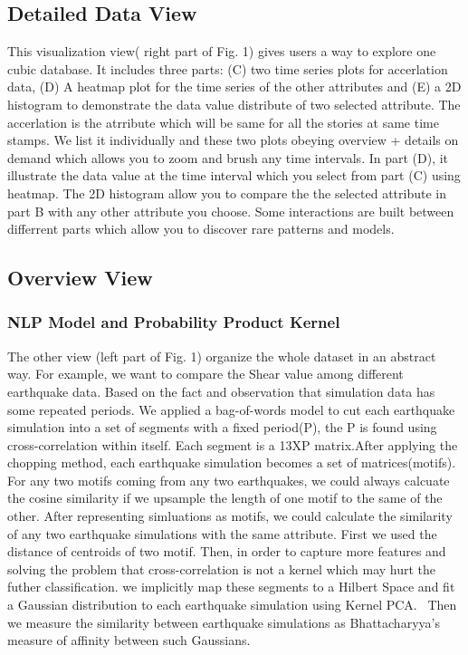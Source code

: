 \subsection{Detailed Data View}
\label{sec:context }
This visualization view( right part of Fig. 1) gives users a way to explore one cubic database. It includes three parts: (C) two time series plots for accerlation data, (D) A heatmap plot for the time series of the other attributes and (E) a 2D histogram to demonstrate the data value distribute of two selected attribute. The accerlation is the atrribute which will be same for all the stories at same time stamps. We list it individually and these two plots obeying overview + details on demand which allows you to zoom and brush any  time intervals. In part (D), it illustrate the data value at the time interval which you select from part (C) using heatmap. The 2D histogram allow you to compare the the selected attribute in part B with any other attribute you choose. Some interactions are built between differrent parts which allow you to discover rare patterns and models.

\subsection{Overview View}
\subsubsection{NLP Model and Probability Product Kernel}
\label{sec:method}
The other view (left part of Fig. 1) organize the whole dataset in an abstract way. For example, we want to compare the Shear value among different earthquake data. Based on the fact and observation that simulation data has some repeated periods. We applied a bag-of-words model to cut each earthquake simulation into a set of segments with a fixed period(P), the P is found using cross-correlation within itself. Each segment is a 13XP matrix.After applying the chopping method, each earthquake simulation becomes a set of matrices(motifs). For any two motifs coming from any two earthquakes, we could always calcuate the cosine similarity if we upsample the length of one motif to the same of the other. After representing simluations as motifs, we could calculate the similarity of any two earthquake simulations with the same attribute. First we used the distance of centroids of two motif. Then, in order to capture more features and solving the problem that cross-correlation is not a kernel which may hurt the futher classification. we implicitly map these segments to a Hilbert Space and fit a Gaussian distribution to each earthquake simulation using Kernel PCA.~\cite{conf/icml/KondorJ03} Then we measure the similarity between earthquake simulations as Bhattacharyya’s measure of affinity between such Gaussians.
